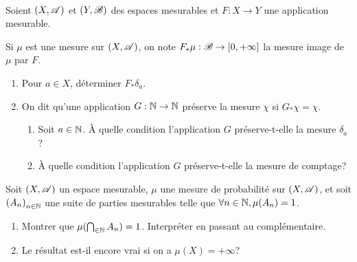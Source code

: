 \begin{td-exo}\, %
    
    Soient \((X,\mathscr{A})\) et \((Y,\mathscr{B})\) des espaces mesurables 
    et \(F:X\to Y\) une application mesurable. 
    
    Si \(\mu\) est une mesure sur \((X,\mathscr{A})\), 
    on note \(F_*\mu:\mathscr{B}\to[0,+\infty]\) la mesure image de \(\mu\) par \(F\).
    \begin{enumerate}
        \item Pour \(a\in X\), déterminer \(F_*\delta_a\).
        \item On dit qu'une application \(G:\mathbb{N}\to \mathbb{N}\) préserve la mesure \(\chi\) si \(G_*\chi=\chi\).
        \begin{enumerate}
            \item Soit \(a\in\mathbb{N}\). À quelle condition l'application \(G\) préserve-t-elle la mesure \(\delta_a\)?
            \item À quelle condition l'application \(G\) préserve-t-elle la mesure de comptage?
        \end{enumerate}
    \end{enumerate}
\end{td-exo}

\begin{td-exo}
    Soit \((X,\mathscr{A})\) un espace mesurable, \(\mu\) une mesure de probabilité sur \((X,\mathscr{A})\), et soit \({(A_n)}_{n\in\mathbb{N}}\) une suite de parties mesurables telle que \(\forall n\in\mathbb{N}, \mu(A_n)=1\).
    \begin{enumerate} %
        \item    Montrer que \(\mu(\bigcap_{\in\mathbb{N}}A_n)=1\). Interpréter en passant au complémentaire.
        \item    Le résultat est-il encore vrai si on a \(\mu(X)=+\infty\)?
    \end{enumerate}
\end{td-exo}

